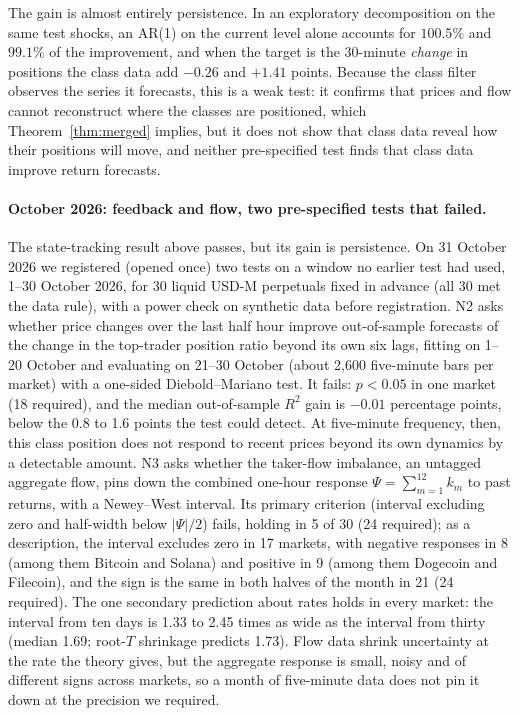 \documentclass[12pt]{article}
\theoremstyle{definition}
\theoremstyle{remark}
\begin{document}
The gain is almost entirely persistence. In an exploratory decomposition on the same test shocks, an AR(1) on the current level alone accounts for $100.5\%$ and $99.1\%$ of the improvement, and when the target is the 30-minute \emph{change} in positions the class data add $-0.26$ and $+1.41$ points. Because the class filter observes the series it forecasts, this is a weak test: it confirms that prices and flow cannot reconstruct where the classes are positioned, which Theorem~\ref{thm:merged} implies, but it does not show that class data reveal how their positions will move, and neither pre-specified test finds that class data improve return forecasts.

\paragraph{October 2026: feedback and flow, two pre-specified tests that failed.} The state-tracking result above passes, but its gain is persistence. On 31 October 2026 we registered (opened once) two tests on a window no earlier test had used, 1--30 October 2026, for 30 liquid USD-M perpetuals fixed in advance (all 30 met the data rule), with a power check on synthetic data before registration. N2 asks whether price changes over the last half hour improve out-of-sample forecasts of the change in the top-trader position ratio beyond its own six lags, fitting on 1--20 October and evaluating on 21--30 October (about 2,600 five-minute bars per market) with a one-sided Diebold--Mariano test. It fails: $p<0.05$ in one market (18 required), and the median out-of-sample $R^2$ gain is $-0.01$ percentage points, below the 0.8 to 1.6 points the test could detect. At five-minute frequency, then, this class position does not respond to recent prices beyond its own dynamics by a detectable amount. N3 asks whether the taker-flow imbalance, an untagged aggregate flow, pins down the combined one-hour response $\Psi=\sum_{m=1}^{12}k_m$ to past returns, with a Newey--West interval. Its primary criterion (interval excluding zero and half-width below $|\Psi|/2$) fails, holding in 5 of 30 (24 required); as a description, the interval excludes zero in 17 markets, with negative responses in 8 (among them Bitcoin and Solana) and positive in 9 (among them Dogecoin and Filecoin), and the sign is the same in both halves of the month in 21 (24 required). The one secondary prediction about rates holds in every market: the interval from ten days is 1.33 to 2.45 times as wide as the interval from thirty (median 1.69; root-$T$ shrinkage predicts 1.73). Flow data shrink uncertainty at the rate the theory gives, but the aggregate response is small, noisy and of different signs across markets, so a month of five-minute data does not pin it down at the precision we required.
\end{document}
